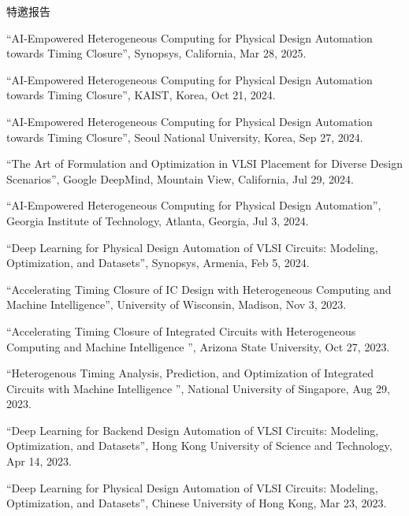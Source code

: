 \begin{rSection}{特邀报告}
\begin{description}[font=\normalfont]
\item[{[14]}]{
``AI-Empowered Heterogeneous Computing for Physical Design Automation towards Timing Closure'', Synopsys, California, Mar 28, 2025. 
}

\item[{[13]}]{
``AI-Empowered Heterogeneous Computing for Physical Design Automation towards Timing Closure'', KAIST, Korea, Oct 21, 2024. 
}

\item[{[12]}]{
``AI-Empowered Heterogeneous Computing for Physical Design Automation towards Timing Closure'', Seoul National University, Korea, Sep 27, 2024. 
}

\item[{[11]}]{
``The Art of Formulation and Optimization in VLSI Placement for Diverse Design Scenarios'', Google DeepMind, Mountain View, California, Jul 29, 2024. 
}

\item[{[10]}]{
``AI-Empowered Heterogeneous Computing for Physical Design Automation'', Georgia Institute of Technology, Atlanta, Georgia, Jul 3, 2024. 
}

\item[{[9]}]{
``Deep Learning for Physical Design Automation of VLSI Circuits: Modeling, Optimization, and Datasets'', Synopsys, Armenia, Feb 5, 2024. 
}

\item[{[8]}]{
``Accelerating Timing Closure of IC Design with Heterogeneous Computing and Machine Intelligence'', University of Wisconsin, Madison, Nov 3, 2023. 
}

\item[{[7]}]{
``Accelerating Timing Closure of Integrated Circuits with Heterogeneous Computing and Machine Intelligence '', Arizona State University, Oct 27, 2023. 
}

\item[{[6]}]{
``Heterogenous Timing Analysis, Prediction, and Optimization of Integrated Circuits with Machine Intelligence '', National University of Singapore, Aug 29, 2023. 
}

\item[{[5]}]{
``Deep Learning for Backend Design Automation of VLSI Circuits: Modeling, Optimization, and Datasets'', Hong Kong University of Science and Technology, Apr 14, 2023. 
}

\item[{[4]}]{
``Deep Learning for Physical Design Automation of VLSI Circuits: Modeling, Optimization, and Datasets'', Chinese University of Hong Kong, Mar 23, 2023. 
}


\end{description}
\end{rSection}

